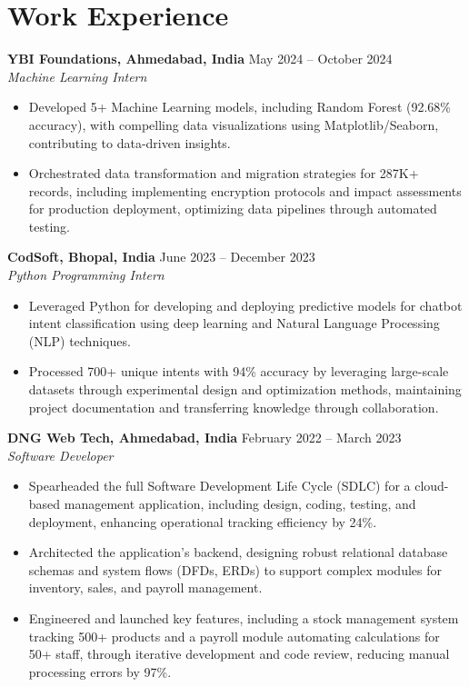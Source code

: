 \documentclass[a4paper,10pt]{article}
\begin{document}
\section*{Work Experience}
\textbf{YBI Foundations, Ahmedabad, India} \hfill May 2024 -- October 2024\\
\textit{Machine Learning Intern} \\
\begin{itemize}[leftmargin=*, itemsep=0pt, parsep=1pt]
\vspace{-6mm}
\item Developed 5+ Machine Learning models, including Random Forest (92.68\% accuracy), with compelling data visualizations using Matplotlib/Seaborn, contributing to data-driven insights.
\item Orchestrated data transformation and migration strategies for 287K+ records, including implementing encryption protocols and impact assessments for production deployment, optimizing data pipelines through automated testing.
\end{itemize}
\textbf{CodSoft, Bhopal, India} \hfill June 2023 -- December 2023\\
\textit{Python Programming Intern} \\
\begin{itemize}[leftmargin=*, itemsep=0pt, parsep=1pt]
\vspace{-6mm}
\item Leveraged Python for developing and deploying predictive models for chatbot intent classification using deep learning and Natural Language Processing (NLP) techniques.
\item Processed 700+ unique intents with 94\% accuracy by leveraging large-scale datasets through experimental design and optimization methods, maintaining project documentation and transferring knowledge through collaboration.
\vspace{-1mm}
\end{itemize}

\textbf{DNG Web Tech, Ahmedabad, India} \hfill February 2022 -- March 2023 \\
\textit{Software Developer} \\

\begin{itemize}[leftmargin=*, itemsep=0pt, parsep=1pt] %
\vspace{-7mm}
    \item Spearheaded the full Software Development Life Cycle (SDLC) for a cloud-based management application, including design, coding, testing, and deployment, enhancing operational tracking efficiency by 24\%.
\item Architected the application's backend, designing robust relational database schemas and system flows (DFDs, ERDs) to support complex modules for inventory, sales, and payroll management.
\item Engineered and launched key features, including a stock management system tracking 500+ products and a payroll module automating calculations for 50+ staff, through iterative development and code review, reducing manual processing errors by 97\%. 

\end{itemize}
\end{document}
